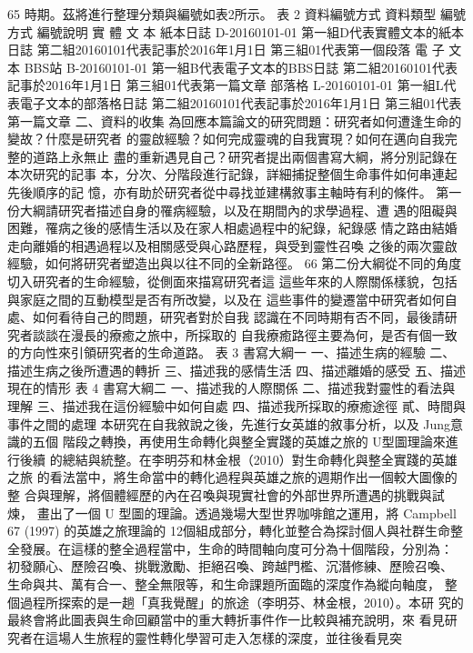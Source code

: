 65 
時期。茲將進行整理分類與編號如表2所示。 
表 2  
資料編號方式 
資料類型 
編號方式 
編號說明 
實
體
文
本 
紙本日誌 D-20160101-01 
第一組D代表實體文本的紙本日誌 
第二組20160101代表記事於2016年1月1日 
第三組01代表第一個段落 
電
子
文
本 
BBS站 B-20160101-01 
第一組B代表電子文本的BBS日誌 
第二組20160101代表記事於2016年1月1日 
第三組01代表第一篇文章 
部落格 L-20160101-01 
第一組L代表電子文本的部落格日誌 
第二組20160101代表記事於2016年1月1日 
第三組01代表第一篇文章 
二、資料的收集 
為回應本篇論文的研究問題：研究者如何遭逢生命的變故？什麼是研究者
的靈啟經驗？如何完成靈魂的自我實現？如何在邁向自我完整的道路上永無止
盡的重新遇見自己？研究者提出兩個書寫大綱，將分別記錄在本次研究的記事
本，分次、分階段進行記錄，詳細捕捉整個生命事件如何串連起先後順序的記
憶，亦有助於研究者從中尋找並建構敘事主軸時有利的條件。 
第一份大綱請研究者描述自身的罹病經驗，以及在期間內的求學過程、遭
遇的阻礙與困難，罹病之後的感情生活以及在家人相處過程中的紀錄，紀錄感
情之路由結婚走向離婚的相遇過程以及相關感受與心路歷程，與受到靈性召喚
之後的兩次靈啟經驗，如何將研究者塑造出與以往不同的全新路徑。 
66 
第二份大綱從不同的角度切入研究者的生命經驗，從側面來描寫研究者這
這些年來的人際關係樣貌，包括與家庭之間的互動模型是否有所改變，以及在
這些事件的變遷當中研究者如何自處、如何看待自己的問題，研究者對於自我
認識在不同時期有否不同，最後請研究者談談在漫長的療癒之旅中，所採取的
自我療癒路徑主要為何，是否有個一致的方向性來引領研究者的生命道路。 
表 3  
書寫大綱一 
一、描述生病的經驗 
二、描述生病之後所遭遇的轉折 
三、描述我的感情生活 
四、描述離婚的感受 
五、描述現在的情形 
表 4  
書寫大綱二 
一、描述我的人際關係 
二、描述我對靈性的看法與理解 
三、描述我在這份經驗中如何自處 
四、描述我所採取的療癒途徑 
貳、時間與事件之間的處理 
本研究在自我敘說之後，先進行女英雄的敘事分析，以及 Jung意識的五個
階段之轉換，再使用生命轉化與整全實踐的英雄之旅的 U型圖理論來進行後續
的總結與統整。在李明芬和林金根（2010）對生命轉化與整全實踐的英雄之旅
的看法當中，將生命當中的轉化過程與英雄之旅的週期作出一個較大圖像的整
合與理解，將個體經歷的內在召喚與現實社會的外部世界所遭遇的挑戰與試煉，
畫出了一個 U 型圖的理論。透過幾場大型世界咖啡館之運用，將 Campbell 
67 
(1997) 的英雄之旅理論的 12個組成部分，轉化並整合為探討個人與社群生命整
全發展。在這樣的整全過程當中，生命的時間軸向度可分為十個階段，分別為：
初發願心、歷險召喚、挑戰激勵、拒絕召喚、跨越門檻、沉潛修練、歷險召喚、
生命與共、萬有合一、整全無限等，和生命課題所面臨的深度作為縱向軸度，
整個過程所探索的是一趟「真我覺醒」的旅途（李明芬、林金根，2010）。本研
究的最終會將此圖表與生命回顧當中的重大轉折事件作一比較與補充說明，來
看見研究者在這場人生旅程的靈性轉化學習可走入怎樣的深度，並往後看見突
